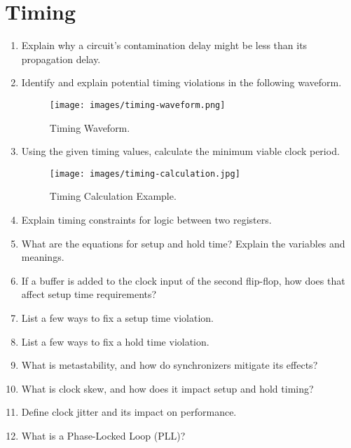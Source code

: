 \documentclass[11pt]{article}
\begin{document}
\section{Timing}
\begin{enumerate}
    \item Explain why a circuit's contamination delay might be less than its
    propagation delay.

    \item Identify and explain potential timing violations in the following waveform.
    \begin{figure}[H]
        \centering
        \texttt{[image: images/timing-waveform.png]}
        \caption{Timing Waveform.}
        \label{fig:timing_violation}
    \end{figure}
    \item Using the given timing values, calculate the minimum viable clock period.
    \begin{figure}[H]
        \centering
        \texttt{[image: images/timing-calculation.jpg]}
        \caption{Timing Calculation Example.}
        \label{fig:timing_calc}
    \end{figure}
    \item Explain timing constraints for logic between two registers.
    \item What are the equations for setup and hold time? Explain the variables and meanings.
    \item If a buffer is added to the clock input of the second flip-flop, how
    does that affect setup time requirements?
    \item List a few ways to fix a setup time violation.
    \item List a few ways to fix a hold time violation.
    \item What is metastability, and how do synchronizers mitigate its effects?
    \item What is clock skew, and how does it impact setup and hold timing?
    \item Define clock jitter and its impact on performance.
    \item What is a Phase-Locked Loop (PLL)?
\end{enumerate}

\end{document}
